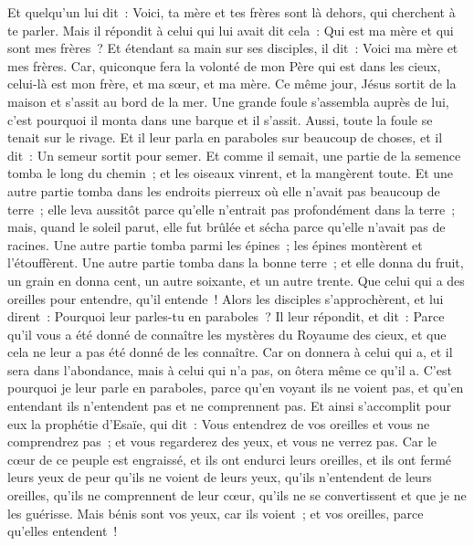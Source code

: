 \begin{multicols}{2}
Et quelqu'un lui dit~: Voici, ta mère et tes frères sont là dehors, qui cherchent à te parler.
Mais il répondit à celui qui lui avait dit cela~: Qui est ma mère et qui sont mes frères~?
Et étendant sa main sur ses disciples, il dit~: Voici ma mère et mes frères.
Car, quiconque fera la volonté de mon Père qui est dans les cieux, celui-là est mon frère, et ma sœur, et ma mère.
\VerseOne{}Ce même jour, Jésus sortit de la maison et s'assit au bord de la mer.
Une grande foule s'assembla auprès de lui, c'est pourquoi il monta dans une barque et il s'assit. Aussi, toute la foule se tenait sur le rivage.
Et il leur parla en paraboles sur beaucoup de choses, et il dit~: Un semeur sortit pour semer.
Et comme il semait, une partie de la semence tomba le long du chemin~; et les oiseaux vinrent, et la mangèrent toute.
Et une autre partie tomba dans les endroits pierreux où elle n'avait pas beaucoup de terre~; elle leva aussitôt parce qu'elle n'entrait pas profondément dans la terre~;
mais, quand le soleil parut, elle fut brûlée et sécha parce qu'elle n'avait pas de racines.
Une autre partie tomba parmi les épines~; les épines montèrent et l'étouffèrent.
Une autre partie tomba dans la bonne terre~; et elle donna du fruit, un grain en donna cent, un autre soixante, et un autre trente.
Que celui qui a des oreilles pour entendre, qu'il entende~!
Alors les disciples s'approchèrent, et lui dirent~: Pourquoi leur parles-tu en paraboles~?
Il leur répondit, et dit~: Parce qu'il vous a été donné de connaître les mystères du Royaume des cieux, et que cela ne leur a pas été donné de les connaître.
Car on donnera à celui qui a, et il sera dans l'abondance, mais à celui qui n'a pas, on ôtera même ce qu'il a.
C'est pourquoi je leur parle en paraboles, parce qu'en voyant ils ne voient pas, et qu'en entendant ils n'entendent pas et ne comprennent pas.
Et ainsi s'accomplit pour eux la prophétie d'Esaïe, qui dit~: Vous entendrez de vos oreilles et vous ne comprendrez pas~; et vous regarderez des yeux, et vous ne verrez pas.
Car le cœur de ce peuple est engraissé, et ils ont endurci leurs oreilles, et ils ont fermé leurs yeux de peur qu'ils ne voient de leurs yeux, qu'ils n'entendent de leurs oreilles, qu'ils ne comprennent de leur cœur, qu'ils ne se convertissent et que je ne les guérisse.
Mais bénis sont vos yeux, car ils voient~; et vos oreilles, parce qu'elles entendent~!

\end{multicols}
